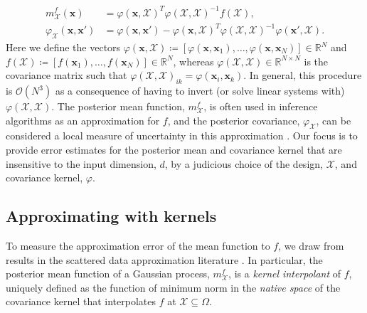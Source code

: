 \documentclass[pdflatex,sn-mathphys-num]{sn-jnl}%
\theoremstyle{thmstyleone}%
\theoremstyle{thmstyletwo}%
\theoremstyle{thmstylethree}%
\begin{document}
\begin{align}
    m_{\mathcal{X}}^f(\mathbf{x})&=\varphi(\mathbf{x},\mathcal{X})^T\varphi(\mathcal{X},\mathcal{X})^{-1}f(\mathcal{X}),\label{eq: mean func}\\
    \varphi_{\mathcal{X}}(\mathbf{x},\mathbf{x}')&=\varphi(\mathbf{x},\mathbf{x}')-\varphi(\mathbf{x},\mathcal{X})^T\varphi(\mathcal{X},\mathcal{X})^{-1}\varphi(\mathbf{x}',\mathcal{X}).
\end{align}
Here we define the vectors \(\varphi(\mathbf{x},\mathcal{X})\coloneqq[\varphi(\mathbf{x},\mathbf{x}_1),\dots,\varphi(\mathbf{x},\mathbf{x}_N)]\in\mathbb{R}^N\) and \(f(\mathcal{X})\coloneqq[f(\mathbf{x}_1),\dots,f(\mathbf{x}_N)]\in\mathbb{R}^N\), whereas \(\varphi(\mathcal{X},\mathcal{X})\in\mathbb{R}^{N\times N}\) is the covariance matrix such that \(\varphi(\mathcal{X},\mathcal{X})_{ik}=\varphi(\mathbf{x}_i,\mathbf{x}_k)\).
In general, this procedure is \(\mathcal{O}(N^3)\) as a consequence of having to invert (or solve linear systems with) \(\varphi(\mathcal{X},\mathcal{X})\). The posterior mean function, \(m_{\mathcal{X}}^f\), is often used in inference algorithms as an approximation for \(f\), and the posterior covariance, \(\varphi_{\mathcal{X}}\), can be considered a local measure of uncertainty in this approximation \cite{conrad2017statistical,bai2024gaussian}. Our focus is to provide error estimates for the posterior mean and covariance kernel that are insensitive to the input dimension, \(d\), by a judicious choice of the design, \(\mathcal{X}\), and covariance kernel, \(\varphi\).


\subsection{Approximating with kernels}\label{subsec: approximating with kernels}
To measure the approximation error of the mean function to \(f\), we draw from results in the scattered data approximation literature \cite{wendland_2004}. In particular, the posterior mean function of a Gaussian process, \(m_\mathcal{X}^f\), is a \textit{kernel interpolant} of \(f\), uniquely defined as the function of minimum norm in the \textit{native space} of the covariance kernel that interpolates \(f\) at \(\mathcal{X}\subseteq \Omega\).
\end{document}
